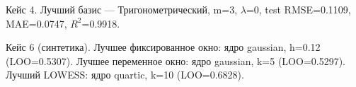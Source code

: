 Кейс 4. Лучший базис — Тригонометрический, m=3,
$\lambda$=0, test RMSE=0.1109,
MAE=0.0747, $R^2$=0.9918.

Кейс 6 (синтетика). Лучшее фиксированное окно: ядро gaussian, h=0.12 (LOO=0.5307).
Лучшее переменное окно: ядро gaussian, k=5 (LOO=0.5297).
Лучший LOWESS: ядро quartic, k=10 (LOO=0.6828).
